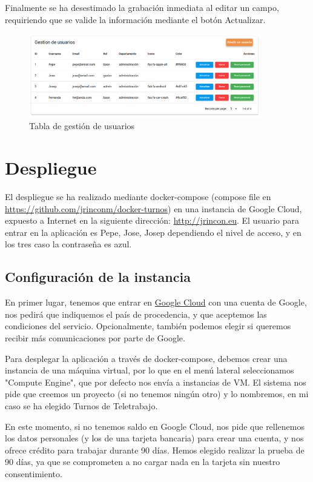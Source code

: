 \documentclass[11pt,spanish,listoffigures,listoftables]{tfgetsinf}
\begin{document}
Finalmente se ha desestimado la grabación inmediata al editar un campo, requiriendo que se valide la información mediante el botón Actualizar.

\begin{figure}[ht!] %
  \centering
  \includegraphics[width=0.90\textwidth]{img/gestionusuarioweb.png}
  \caption{Tabla de gestión de usuarios}
  \label{fig:gestionusuarios}
\end{figure}

\chapter{Despliegue}

El despliegue se ha realizado mediante docker-compose (compose file en \url{https://github.com/jrinconm/docker-turnos}) en una instancia de Google Cloud, expuesto a Internet en la siguiente dirección:
\url{http://jrincon.eu}. El usuario para entrar en la aplicación es Pepe, Jose, Josep dependiendo el nivel de acceso, y en los tres caso la contraseña es azul.

\section{Configuración de la instancia}
En primer lugar, tenemos que entrar en \href{https://console.cloud.google.com/}{Google Cloud} con una cuenta de Google, nos pedirá que indiquemos el país de procedencia, y que aceptemos las condiciones del servicio.
Opcionalmente, también podemos elegir si queremos recibir más comunicaciones por parte de Google.

Para desplegar la aplicación a través de docker-compose, debemos crear una instancia de una máquina virtual, por lo que en el menú lateral seleccionamos "Compute Engine", que por defecto nos envía a instancias de VM.
El sistema nos pide que creemos un proyecto (si no tenemos ningún otro) y lo nombremos, en mi caso se ha elegido Turnos de Teletrabajo.

En este momento, si no tenemos saldo en Google Cloud, nos pide que rellenemos los datos personales (y los de una tarjeta bancaria) para crear una cuenta, y nos ofrece crédito para trabajar durante 90 días. 
Hemos elegido realizar la prueba de 90 días, ya que se comprometen a no cargar nada en la tarjeta sin nuestro consentimiento.
\end{document}
